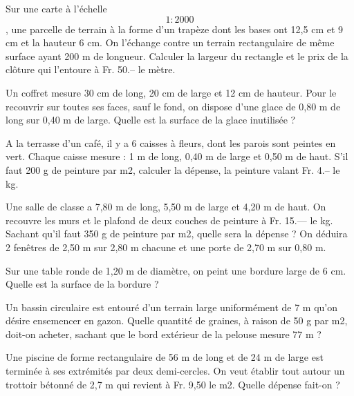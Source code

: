 \begin{exercice}
Sur une carte à l’échelle \[1:2000\], une parcelle de terrain à la forme d’un trapèze dont les bases ont 12,5 cm et 9 cm et la hauteur 6 cm. On l’échange contre un terrain rectangulaire de même surface ayant 200 m de longueur. 
Calculer la largeur du rectangle et le prix de la clôture qui l’entoure à Fr. 50.– le mètre.
\end{exercice}

\begin{exercice}
Un coffret mesure 30 cm de long, 20 cm de large et 12 cm de hauteur. Pour le recouvrir sur toutes ses faces, sauf le fond, on dispose d’une glace de 0,80 m de long sur 0,40 m de large. 
Quelle est la surface de la glace inutilisée ?
\end{exercice}

\begin{exercice}
A la terrasse d’un café, il y a 6 caisses à fleurs, dont les parois sont peintes en vert. Chaque caisse mesure : 1 m de long, 0,40 m de large et 0,50 m de haut. 
S’il faut 200 g de peinture par m2, calculer la dépense, la peinture valant Fr. 4.– le kg.
\end{exercice}

\begin{exercice}
Une salle de classe a 7,80 m de long, 5,50 m de large et 4,20 m de haut. On recouvre les murs et le plafond de deux couches de peinture à Fr. 15.— le kg. 
Sachant qu’il faut 350 g de peinture par m2, quelle sera la dépense ? 
On déduira 2 fenêtres de 2,50 m sur 2,80 m chacune et une porte de 2,70 m sur 0,80 m.
\end{exercice}

\begin{exercice}
Sur une table ronde de 1,20 m de diamètre, on peint une bordure large de 6 cm. 
Quelle est la surface de la bordure ?
\end{exercice}

\begin{exercice}
Un bassin circulaire est entouré d’un terrain large uniformément de 7 m qu’on désire ensemencer en gazon. 
Quelle quantité de graines, à raison de 50 g par m2, doit-on acheter, sachant que le bord extérieur de la pelouse mesure 77 m ?
\end{exercice}

\begin{exercice}
Une piscine de forme rectangulaire de 56 m de long et de 24 m de large est terminée à ses extrémités par deux demi-cercles. On veut établir tout autour un trottoir bétonné de 2,7 m qui revient à Fr. 9,50 le m2. 
Quelle dépense fait-on ? 
\end{exercice}

